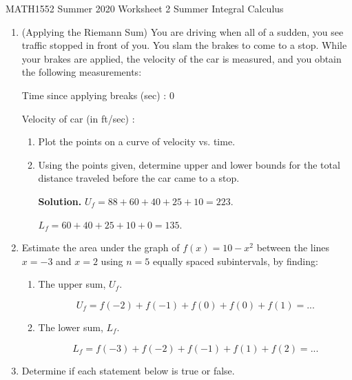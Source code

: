 \documentclass[12pt]{article}
\begin{document}
\noindent
MATH1552 Summer 2020
\hspace{2.2cm}
Worksheet 2 Summer
\hspace{2cm} Integral Calculus

\vspace{2mm}


\begin{enumerate}
    \item (Applying the Riemann Sum) You are driving when all of a sudden, you see traffic
stopped in front of you. You slam the brakes to come to a stop. While your brakes are
applied, the velocity of the car is measured, and you obtain the following measurements:

Time since applying breaks (sec) : 0     

Velocity of car (in ft/sec) :\quad \quad  {}     

    \begin{enumerate}
        \item Plot the points on a curve of velocity vs. time.

        \item Using the points given, determine upper and lower bounds for the total distance traveled
before the car came to a stop.

{\bf Solution.} $U_f = 88+60+40+25+10=223$.

$L_f = 60+40+25+10+0=135$.

    \end{enumerate}

\item Estimate the area under the graph of $f(x) = 10-x^2$ between the lines $x = -3$ and
$x = 2$ using $n = 5$ equally spaced subintervals, by finding:

	\begin{enumerate}
	\item The upper sum, $U_f$.


	$$U_f=f(-2)+f(-1)+f(0)+f(0)+f(1)=...$$

	\item The lower sum, $L_f$.

	$$L_f= f(-3)+f(-2)+f(-1)+f(1)+f(2)=...$$	

	\end{enumerate}

\item Determine if each statement below is true or false.


\end{enumerate}
\end{document}

